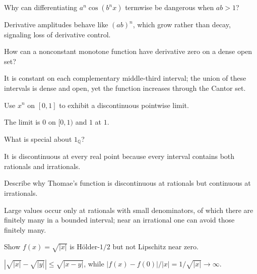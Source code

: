 \begin{problem}\label{prob:ii15-problem-02}
Why can differentiating $a^n\cos(b^nx)$ termwise be dangerous when $ab>1$?
\end{problem}
\begin{solution}
Derivative amplitudes behave like $(ab)^n$, which grow rather than decay, signaling loss of derivative control.
\end{solution}

\begin{problem}\label{prob:ii15-problem-03}
How can a nonconstant monotone function have derivative zero on a dense open set?
\end{problem}
\begin{solution}
It is constant on each complementary middle-third interval; the union of these intervals is dense and open, yet the function increases through the Cantor set.
\end{solution}

\begin{problem}\label{prob:ii15-problem-04}
Use $x^n$ on $[0,1]$ to exhibit a discontinuous pointwise limit.
\end{problem}
\begin{solution}
The limit is $0$ on $[0,1)$ and $1$ at $1$.
\end{solution}

\begin{problem}\label{prob:ii15-problem-05}
What is special about $1_{\mathbb Q}$?
\end{problem}
\begin{solution}
It is discontinuous at every real point because every interval contains both rationals and irrationals.
\end{solution}

\begin{problem}\label{prob:ii15-problem-06}
Describe why Thomae's function is discontinuous at rationals but continuous at irrationals.
\end{problem}
\begin{solution}
Large values occur only at rationals with small denominators, of which there are finitely many in a bounded interval; near an irrational one can avoid those finitely many.
\end{solution}

\begin{problem}\label{prob:ii15-problem-07}
Show $f(x)=\sqrt{|x|}$ is Hölder-$1/2$ but not Lipschitz near zero.
\end{problem}
\begin{solution}
$|\sqrt{|x|}-\sqrt{|y|}|\le\sqrt{|x-y|}$, while $|f(x)-f(0)|/|x|=1/\sqrt{|x|}\to\infty$.
\end{solution}

